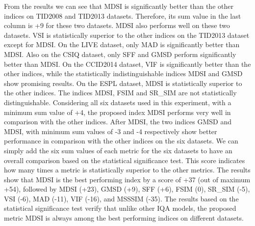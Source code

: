 From the results we can see that MDSI is significantly better than the other indices on TID2008 and TID2013 datasets. Therefore, its sum value in the last column is +9 for these two datasets. MDSI also performs well on these two datasets. VSI is statistically superior to the other indices on the TID2013 dataset except for MDSI. On the LIVE dataset, only MAD is significantly better than MDSI. Also on the CSIQ dataset, only SFF and GMSD perform significantly better than MDSI. On the CCID2014 dataset, VIF is significantly better than the other indices, while the statistically indistinguishable indices MDSI and GMSD show promising results. On the ESPL dataset, MDSI is statistically superior to the other indices. The indices MDSI, FSIM and SR\_SIM are not statistically distinguishable. Considering all six datasets used in this experiment, with a minimum sum value of +4, the proposed index MDSI performs very well in comparison with the other indices. After MDSI, the two indices GMSD and MDSI, with minimum sum values of -3 and -4 respectively show better performance in comparison with the other indices on the six datasets. We can simply add the six sum values of each metric for the six datasets to have an overall comparison based on the statistical significance test. This score indicates how many times a metric is statistically superior to the other metrics. The results show that MDSI is the best performing index by a score of +37 (out of maximum +54), followed by MDSI (+23), GMSD (+9), SFF (+6), FSIM (0), SR\_SIM (-5), VSI (-6), MAD (-11), VIF (-16), and MSSSIM (-35). The results based on the statistical significance test verify that unlike other IQA models, the proposed metric MDSI is always among the best performing indices on different datasets.                        










